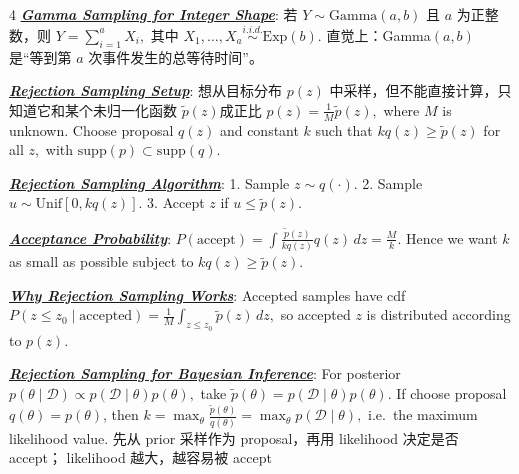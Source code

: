 \documentclass[12pt]{article}
\newcommand{\bulletPoint}[1]{\underline{\textit{\textbf{#1}}}}
\begin{document}
\begin{multicols*}{4}
\bulletPoint{Gamma Sampling for Integer Shape}:
若 $Y\sim \mathrm{Gamma}(a,b)$ 且 $a$ 为正整数，则
$Y=\sum_{i=1}^a X_i,$ 其中 $X_1,\dots,X_a \overset{i.i.d.}{\sim} \mathrm{Exp}(b).$
直觉上：Gamma$(a,b)$ 是“等到第 $a$ 次事件发生的总等待时间”。

\bulletPoint{Rejection Sampling Setup}:
想从目标分布 $p(z)$ 中采样，但不能直接计算，只知道它和某个未归一化函数 $\tilde p(z)$成正比
$p(z)=\frac{1}{M}\tilde p(z),$
where $M$ is unknown.
Choose proposal $q(z)$ and constant $k$ such that
$kq(z)\ge \tilde p(z)$ for all $z,$
with $\mathrm{supp}(p)\subset \mathrm{supp}(q).$

\bulletPoint{Rejection Sampling Algorithm}:
1. Sample $z\sim q(\cdot).$
2. Sample $u\sim \mathrm{Unif}[0,kq(z)].$
3. Accept $z$ if $u\le \tilde p(z).$

\bulletPoint{Acceptance Probability}:
\textcolor{purple!60!black}{$\textstyle
P(\text{accept})
=
\int \frac{\tilde p(z)}{kq(z)}q(z)\,dz
=
\frac{M}{k}.
$}
Hence we want $k$ as small as possible subject to $kq(z)\ge \tilde p(z).$

\bulletPoint{Why Rejection Sampling Works}:
Accepted samples have cdf
$\textstyle P(z\le z_0\mid \text{accepted})=\frac{1}{M}\int_{z\le z_0}\tilde p(z)\,dz,$
so accepted $z$ is distributed according to $p(z).$

\bulletPoint{Rejection Sampling for Bayesian Inference}:
For posterior
$p(\theta\mid \mathcal D)\propto p(\mathcal D\mid \theta)p(\theta),$
take
$\tilde p(\theta)=p(\mathcal D\mid \theta)p(\theta).$
If choose proposal $q(\theta)=p(\theta)$, then
$k=\max_\theta \frac{\tilde p(\theta)}{q(\theta)}=\max_\theta p(\mathcal D\mid \theta),$
i.e.\ the maximum likelihood value.
先从 prior 采样作为 proposal，再用 likelihood 决定是否 accept；
likelihood 越大，越容易被 accept





\end{multicols*}
\end{document}
